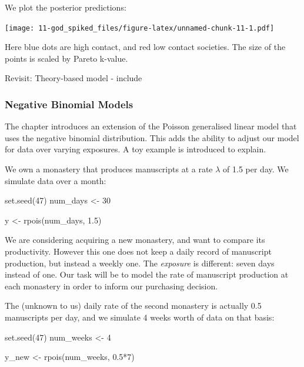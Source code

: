 \documentclass[
]{book}
\newenvironment{Shaded}{\begin{snugshade}}{\end{snugshade}}
\newcommand{\DecValTok}[1]{\textcolor[rgb]{0.00,0.00,0.81}{#1}}
\newcommand{\FloatTok}[1]{\textcolor[rgb]{0.00,0.00,0.81}{#1}}
\newcommand{\FunctionTok}[1]{\textcolor[rgb]{0.00,0.00,0.00}{#1}}
\newcommand{\NormalTok}[1]{#1}
\newcommand{\OtherTok}[1]{\textcolor[rgb]{0.56,0.35,0.01}{#1}}
\newcommand{\SpecialCharTok}[1]{\textcolor[rgb]{0.00,0.00,0.00}{#1}}
\begin{document}
We plot the posterior predictions:

\texttt{[image: 11-god\_spiked\_files/figure-latex/unnamed-chunk-11-1.pdf]}

Here blue dots are high contact, and red low contact societies. The size of the points is scaled by Pareto k-value.

Revisit: Theory-based model - include

\hypertarget{negative-binomial-models}{%
\subsubsection*{Negative Binomial Models}\label{negative-binomial-models}}

The chapter introduces an extension of the Poisson generalised linear model that uses the negative binomial distribution. This adds the ability to adjust our model for data over varying exposures. A toy example is introduced to explain.

We own a monastery that produces manuscripts at a rate \(\lambda\) of 1.5 per day. We simulate data over a month:

\begin{Shaded}
\begin{Highlighting}[]
\FunctionTok{set.seed}\NormalTok{(}\DecValTok{47}\NormalTok{)}
\NormalTok{num\_days }\OtherTok{\textless{}{-}} \DecValTok{30}

\NormalTok{y }\OtherTok{\textless{}{-}} \FunctionTok{rpois}\NormalTok{(num\_days, }\FloatTok{1.5}\NormalTok{)}
\end{Highlighting}
\end{Shaded}

We are considering acquiring a new monastery, and want to compare its productivity. However this one does not keep a daily record of manuscript production, but instead a weekly one. The \emph{exposure} is different: seven days instead of one. Our task will be to model the rate of manuscript production at each monastery in order to inform our purchasing decision.

The (unknown to us) daily rate of the second monastery is actually 0.5 manuscripts per day, and we simulate 4 weeks worth of data on that basis:

\begin{Shaded}
\begin{Highlighting}[]
\FunctionTok{set.seed}\NormalTok{(}\DecValTok{47}\NormalTok{)}
\NormalTok{num\_weeks }\OtherTok{\textless{}{-}} \DecValTok{4}

\NormalTok{y\_new }\OtherTok{\textless{}{-}} \FunctionTok{rpois}\NormalTok{(num\_weeks, }\FloatTok{0.5}\SpecialCharTok{*}\DecValTok{7}\NormalTok{)}
\end{Highlighting}
\end{Shaded}
\end{document}
